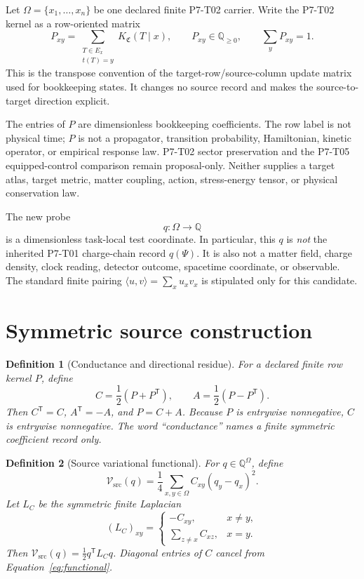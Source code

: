 \documentclass[11pt]{article}
\newtheorem{definition}{Definition}
\newcommand{\Q}{\mathbb Q}
\newcommand{\Vsrc}{\mathcal V_{\mathrm{src}}}
\begin{document}
Let \(\Omega=\{x_1,\ldots,x_n\}\) be one declared finite P7-T02 carrier.
Write the P7-T02 kernel as a row-oriented matrix
\[
 P_{xy}
 =
 \sum_{\substack{T\in E_x\\t(T)=y}}K_{\mathfrak C}(T\mid x),
 \qquad
 P_{xy}\in\Q_{\geq0},
 \qquad
 \sum_yP_{xy}=1.
\]
This is the transpose convention of the target-row/source-column update
matrix used for bookkeeping states.  It changes no source record and makes
the source-to-target direction explicit.

The entries of \(P\) are dimensionless bookkeeping coefficients.  The row
label is not physical time; \(P\) is not a propagator, transition probability,
Hamiltonian, kinetic operator, or empirical response law.  P7-T02 sector
preservation and the P7-T05 equipped-control comparison remain
proposal-only.  Neither supplies a target atlas, target metric, matter
coupling, action, stress-energy tensor, or physical conservation law.

The new probe
\[
 q:\Omega\longrightarrow\Q
\]
is a dimensionless task-local test coordinate.  In particular, this \(q\)
is \emph{not} the inherited P7-T01 charge-chain record \(q(\Psi)\).  It is
also not a matter field, charge density, clock reading, detector outcome,
spacetime coordinate, or observable.  The standard finite pairing
\(\langle u,v\rangle=\sum_xu_xv_x\) is stipulated only for this candidate.

\section{Symmetric source construction}

\begin{definition}[Conductance and directional residue]
For a declared finite row kernel \(P\), define
\begin{equation}
 C=\frac12(P+P^{\mathsf T}),
 \qquad
 A=\frac12(P-P^{\mathsf T}).
 \label{eq:split}
\end{equation}
Then \(C^{\mathsf T}=C\), \(A^{\mathsf T}=-A\), and \(P=C+A\).
Because \(P\) is entrywise nonnegative, \(C\) is entrywise nonnegative.
The word ``conductance'' names a finite symmetric coefficient record only.
\end{definition}

\begin{definition}[Source variational functional]
For \(q\in\Q^\Omega\), define
\begin{equation}
 \Vsrc(q)
 =
 \frac14\sum_{x,y\in\Omega}C_{xy}(q_y-q_x)^2.
 \label{eq:functional}
\end{equation}
Let \(L_C\) be the symmetric finite Laplacian
\begin{equation}
 (L_C)_{xy}
 =
 \begin{cases}
   -C_{xy}, & x\neq y,\\[2pt]
   \displaystyle\sum_{z\neq x}C_{xz}, & x=y.
 \end{cases}
 \label{eq:laplacian}
\end{equation}
Then \(\Vsrc(q)=\tfrac12 q^{\mathsf T}L_Cq\).  Diagonal entries of \(C\)
cancel from Equation~\eqref{eq:functional}.
\end{definition}
\end{document}
